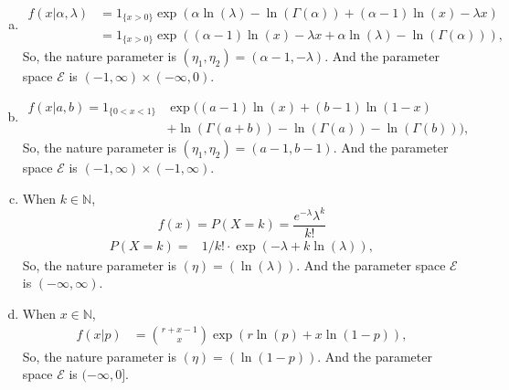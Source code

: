 \begin{solution}
    \begin{enumerate}[(a)]
        \item
        \[
            \begin{aligned}
                f(x|\alpha, \lambda)&=1_{\{x>0\}}\exp(\alpha\ln(\lambda)-\ln(\Gamma(\alpha))+(\alpha-1)\ln(x)-\lambda x)\\
                &=1_{\{x>0\}}\exp((\alpha-1)\ln(x)-\lambda x+\alpha\ln(\lambda)-\ln(\Gamma(\alpha))), 
            \end{aligned}
        \]
        So, the nature parameter is $(\eta_1,\eta_2)=(\alpha-1, -\lambda)$. And the parameter space \(\mathcal{E}\) is \((-1,\infty)\times(-\infty,0)\). 
        \item
        \[
            \begin{aligned}
                f(x|a,b)=1_{\{0<x<1\}}&\exp((a-1)\ln(x)+(b-1)\ln(1-x)\\&+\ln(\Gamma(a+b))-\ln(\Gamma(a))-\ln(\Gamma(b))), 
            \end{aligned}
        \] 
        So, the nature parameter is $(\eta_1,\eta_2)=(a-1, b-1)$. And the parameter space \(\mathcal{E}\) is \((-1,\infty)\times(-1,\infty)\). 
        \item When \(k\in\mathbb{N}\), 
        \[
            f(x)=P(X=k)=\frac{e^{-\lambda}\lambda^k}{k!}
        \]
        \[
            \begin{aligned}
                P(X=k)=&1/k!\cdot\exp(-\lambda+k\ln(\lambda)), 
            \end{aligned}
        \]
        So, the nature parameter is $(\eta)=(\ln(\lambda))$. And the parameter space \(\mathcal{E}\) is \((-\infty,\infty)\). 
        \item When \(x\in\mathbb{N}\), 
        \[
            \begin{aligned}
                f(x|p)&=\binom{r+x-1}{x}\exp\left(r\ln(p)+x\ln(1-p)\right), 
            \end{aligned}
        \]
        So, the nature parameter is $(\eta)=(\ln(1-p))$. And the parameter space \(\mathcal{E}\) is \((-\infty,0]\). 
    \end{enumerate}
\end{solution}

